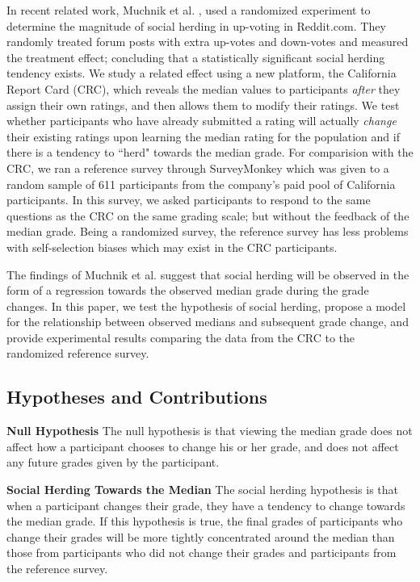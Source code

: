 In recent related work, Muchnik et al. \cite{muchnik2013social}, used a randomized experiment to determine the magnitude of social herding in up-voting in Reddit.com.
They randomly treated forum posts with extra up-votes and down-votes and measured the treatment effect; concluding that a statistically significant social herding tendency exists.
We study a related effect using a new platform, the California Report Card (CRC), which reveals the median values to participants \emph{after} they assign their own ratings, and then allows them to modify their ratings.
We test whether participants who have already submitted a rating will actually \emph{change} their existing ratings upon learning the median rating for the population and if there is a tendency to ``herd" towards the median grade.
For comparision with the CRC, we ran a reference survey through SurveyMonkey which was given to a random sample of 611 participants from the company's paid pool of California participants.
In this survey, we asked participants to respond to the same questions as the CRC on the same grading scale; but without the feedback of the median grade.
Being a randomized survey, the reference survey has less problems with self-selection biases which may exist in the CRC participants. 

The findings of Muchnik et al. suggest that social herding will be observed in the form of a regression towards the observed median grade during the grade changes.
In this paper, we test the hypothesis of social herding, propose a model for the relationship between observed medians and subsequent grade change, and provide experimental results comparing the data from the CRC to the randomized reference survey.

\subsection{Hypotheses and Contributions}
\noindent \textbf{Null Hypothesis} The null hypothesis is that viewing the median grade does not affect how a participant chooses to change his or her grade, and does not affect any future grades given by the participant.

\noindent \textbf{Social Herding Towards the Median} The social herding hypothesis is that when a participant changes their grade, they have a tendency to change towards the median grade. If this hypothesis is true, the final grades of participants who change their grades will be more tightly concentrated around the median than those from participants who did not change their grades and participants from the reference survey.

